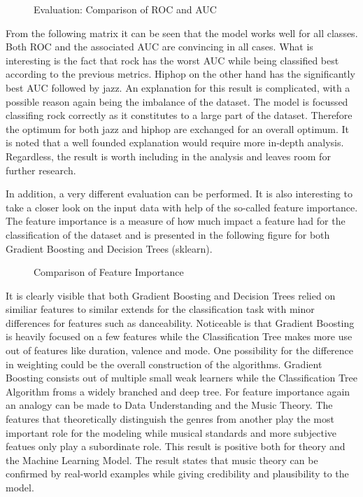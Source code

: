   \begin{figure}[H]
    \centering
    \qquad
    \caption{Evaluation: Comparison of ROC and AUC}%
    \label{fig:roc_and_auc_for_gb_and_dt}%
\end{figure}

From the following matrix it can be seen that the model works well for all classes. Both ROC and the associated AUC are convincing 
in all cases. What is interesting is the fact that rock has the worst AUC while being classified best according to the previous metrics.
Hiphop on the other hand has the significantly best AUC followed by jazz. An explanation for this result is complicated, with a 
possible reason again being the imbalance of the dataset. The model is focussed classifing rock correctly as it constitutes to a large part of the 
dataset. Therefore the optimum for both jazz and hiphop are exchanged for an overall optimum. It is noted that a well founded 
explanation would require more in-depth analysis. Regardless, the result is worth including in the analysis and leaves room for 
further research.   

In addition, a very different evaluation can be performed. It is also interesting to take a closer look on the input data with help of 
the so-called feature importance. The feature importance is a measure of how much impact a feature had for the classification of the 
dataset and is presented in the following figure for both Gradient Boosting and Decision Trees (sklearn). 

\begin{figure}[H]
  \centering
  \qquad
  \caption{Comparison of Feature Importance}%
  \label{fig:feature_inportance_for_gb_and_dt}%
\end{figure}

It is clearly visible that both Gradient Boosting and Decision Trees relied on similiar features to similar extends for the classification task with 
minor differences for features such as danceability. Noticeable is that Gradient Boosting is heavily focused on a few features 
while the Classification Tree makes more use out of features like duration, valence and mode. One possibility for the difference in weighting  
could be the overall construction of the algorithms. Gradient Boosting consists out of multiple small weak learners while the Classification Tree
Algorithm froms a widely branched and deep tree. For feature importance again an analogy can be made to Data Understanding and the Music Theory. 
The features that theoretically distinguish the genres from another play the most important role for the modeling while musical standards and 
more subjective featues only play a subordinate role. This result is positive both for theory and the Machine Learning Model. The result states 
that music theory can be confirmed by real-world examples while giving credibility and plausibility to the model.

